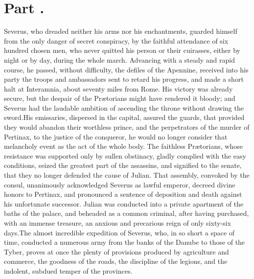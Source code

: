 \section{Part \thesection.}
\thispagestyle{simple}

Severus, who dreaded neither his arms nor his enchantments,
guarded himself from the only danger of secret conspiracy, by the
faithful attendance of six hundred chosen men, who never quitted
his person or their cuirasses, either by night or by day, during
the whole march. Advancing with a steady and rapid course, he
passed, without difficulty, the defiles of the Apennine, received
into his party the troops and ambassadors sent to retard his
progress, and made a short halt at Interamnia, about seventy
miles from Rome. His victory was already secure, but the despair
of the Prætorians might have rendered it bloody; and Severus had
the laudable ambition of ascending the throne without drawing the
sword.\footnotemark[35] His emissaries, dispersed in the capital, assured the
guards, that provided they would abandon their worthless prince,
and the perpetrators of the murder of Pertinax, to the justice of
the conqueror, he would no longer consider that melancholy event
as the act of the whole body. The faithless Prætorians, whose
resistance was supported only by sullen obstinacy, gladly
complied with the easy conditions, seized the greatest part of
the assassins, and signified to the senate, that they no longer
defended the cause of Julian. That assembly, convoked by the
consul, unanimously acknowledged Severus as lawful emperor,
decreed divine honors to Pertinax, and pronounced a sentence of
deposition and death against his unfortunate successor. Julian
was conducted into a private apartment of the baths of the
palace, and beheaded as a common criminal, after having
purchased, with an immense treasure, an anxious and precarious
reign of only sixty-six days.\footnotemark[36] The almost incredible expedition
of Severus, who, in so short a space of time, conducted a
numerous army from the banks of the Danube to those of the Tyber,
proves at once the plenty of provisions produced by agriculture
and commerce, the goodness of the roads, the discipline of the
legions, and the indolent, subdued temper of the provinces.\footnotemark[37]



